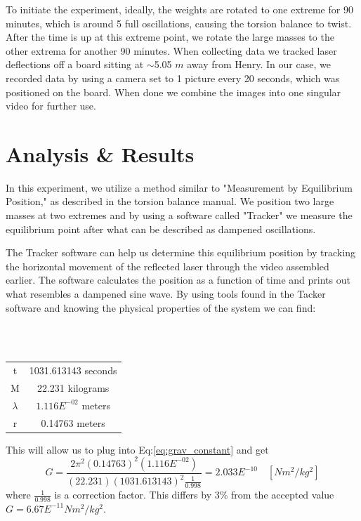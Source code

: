 \documentclass[a4paper,12pt,english]{all-in-one} %
\begin{document}
{To initiate the experiment, ideally, the weights are rotated to one extreme for 90 minutes, which is around 5 full oscillations, causing the torsion balance to twist. After the time is up at this extreme point, we rotate the large masses to the other extrema for another 90 minutes. When collecting data we tracked laser deflections off a board sitting at $\sim$5.05 $m$ away from Henry. In our case, we recorded data by using a camera set to 1 picture every 20 seconds, which was positioned on the board. When done we combine the images into one singular video for further use.
}

\section*{Analysis \& Results}
{
In this experiment, we utilize a method similar to "Measurement by Equilibrium Position," as described in the torsion balance manual. We position two large masses at two extremes and by using a software called "Tracker" we measure the equilibrium point after what can be described as dampened oscillations. 

The Tracker software can help us determine this equilibrium position by tracking the horizontal movement of the reflected laser through the video assembled earlier. The software calculates the position as a function of time and prints out what resembles a dampened sine wave. By using tools found in the Tacker software and knowing the physical properties of the system we can find:

\noindent
\\
\\
\begin{center}
    {\begin{tabular}{c|c} \label{7-prop}
t & 1031.613143 seconds \\
M & 22.231 kilograms \\
$\lambda$ & $1.116E^{-02}$ meters \\
r & 0.14763 meters \\
\end{tabular}}
\end{center}

\noindent
This will allow us to plug into Eq:\eqref{eq:grav_constant} and get 
\begin{equation}\label{eq:grav_constant_plus_constant}
   G = \frac{2\pi^2(0.14763)^2(1.116E^{-02})}{(22.231)(1031.613143)^2\frac{1}{0.998}} = 2.033E^{-10} \quad [Nm^2/kg^2]
\end{equation}
where $\frac{1}{0.998}$ is a correction factor. This differs by 3\% from the accepted value $G = 6.67E^{-11} Nm^2/kg^2$. 

}
\end{document}
